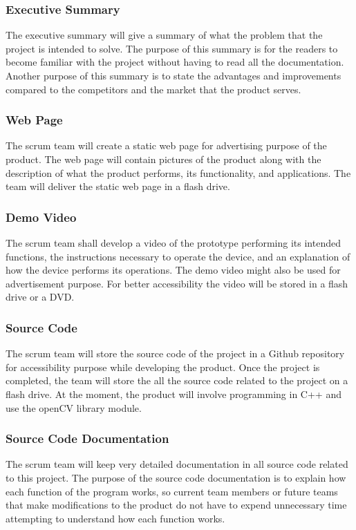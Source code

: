 \subsubsection{Executive Summary}
The executive summary will give a summary of what the problem that the project is intended to solve. The purpose of this summary is for the readers to become familiar with the project without having to read all the documentation. Another purpose of this summary is to state the advantages and improvements compared to the competitors and the market that the product serves.

\subsubsection{Web Page}
The scrum team will create a static web page for advertising purpose of the product. The web page will contain pictures of the product along with the description of what the product performs, its functionality, and applications. The team will deliver the static web page in a flash drive.

\subsubsection{Demo Video}
The scrum team shall develop a video of the prototype performing its intended functions, the instructions necessary to operate the device, and an explanation of how the device performs its operations. The demo video might also be used for advertisement purpose. For better accessibility the video will be stored in a flash drive or a DVD.

\subsubsection{Source Code}
The scrum team will store the source code of the project in a Github repository for accessibility purpose while developing the product. Once the project is completed, the team will store the all the source code related to the project on a flash drive. At the moment, the product will involve programming in C++ and use the openCV library module.

\subsubsection{Source Code Documentation}
The scrum team will keep very detailed documentation in all source code related to this project. The purpose of the source code documentation is to explain how each function of the program works, so current team members or future teams that make modifications to the product do not have to expend unnecessary time attempting to understand how each function works.

